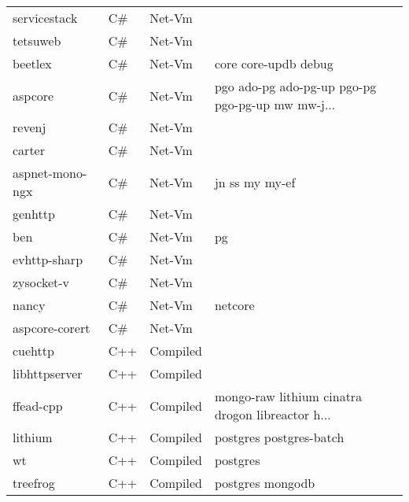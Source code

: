 \begin{longtable}{llll}
    servicestack     & C\# & Net-Vm         &                                                    \\
    tetsuweb         & C\# & Net-Vm         &                                                    \\
    beetlex          & C\# & Net-Vm         & core core-updb debug                               \\
    aspcore          & C\# & Net-Vm         & pgo ado-pg ado-pg-up pgo-pg pgo-pg-up mw mw-j...   \\
    revenj           & C\# & Net-Vm         &                                                    \\
    carter           & C\# & Net-Vm         &                                                    \\
    aspnet-mono-ngx  & C\# & Net-Vm         & jn ss my my-ef                                     \\
    genhttp          & C\# & Net-Vm         &                                                    \\
    ben              & C\# & Net-Vm         & pg                                                 \\
    evhttp-sharp     & C\# & Net-Vm         &                                                    \\
    zysocket-v       & C\# & Net-Vm         &                                                    \\
    nancy            & C\# & Net-Vm         & netcore                                            \\
    aspcore-corert   & C\# & Net-Vm         &                                                    \\
    cuehttp          & C++ & Compiled         &                                                    \\
    libhttpserver    & C++ & Compiled         &                                                    \\
    ffead-cpp        & C++ & Compiled         & mongo-raw lithium cinatra drogon libreactor h...   \\
    lithium          & C++ & Compiled         & postgres postgres-batch                            \\
    wt               & C++ & Compiled         & postgres                                           \\
    treefrog         & C++ & Compiled         & postgres mongodb                                   \\

\end{longtable}
